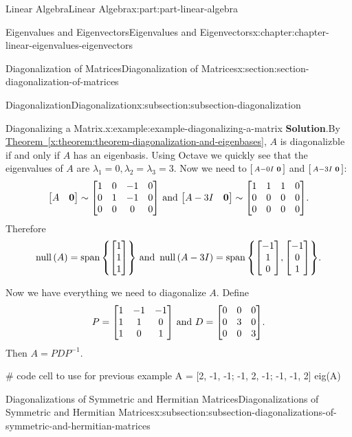 \documentclass[twoside,10pt,]{book}
\newcommand{\blocktitlefont}{\relax}
\newcommand{\xreffont}{\relax}
\numberwithin{equation}{part}
\providecommand{\vb}[1]{\mathbf{#1}}
\newcommand{\nul}[1]{\operatorname{null}{#1}}
\newcommand{\spn}[1]{\operatorname{span}{#1}}
\begin{document}
\begin{partptx}{Linear Algebra}{}{Linear Algebra}{}{}{x:part:part-linear-algebra}
\begin{chapterptx}{Eigenvalues and Eigenvectors}{}{Eigenvalues and Eigenvectors}{}{}{x:chapter:chapter-linear-eigenvalues-eigenvectors}
\begin{sectionptx}{Diagonalization of Matrices}{}{Diagonalization of Matrices}{}{}{x:section:section-diagonalization-of-matrices}
\begin{subsectionptx}{Diagonalization}{}{Diagonalization}{}{}{x:subsection:subsection-diagonalization}
\begin{example}{Diagonalizing a Matrix.}{x:example:example-diagonalizing-a-matrix}
\noindent\textbf{\blocktitlefont Solution}.\hypertarget{g:solution:idm1630558008}{}\quad{}By \hyperref[x:theorem:theorem-diagonalization-and-eigenbases]{Theorem~{\xreffont\ref{x:theorem:theorem-diagonalization-and-eigenbases}}}, \(A\) is diagonalizble if and only if \(A\) has an eigenbasis. Using Octave we quickly see that the eigenvalues of \(A\) are \(\lambda_1 = 0, \lambda_2 = \lambda_3 = 3\). Now we need to \(\smqty[A - 0I & \vb{0}]\) and \(\smqty[A - 3I & \vb{0}]\):%
\begin{equation*}
\mqty[A&\vb{0}] \sim \mqty[1 & 0 & -1 & 0 \\ 0 & 1 & -1 & 0 \\ 0 & 0 & 0 & 0]\text{ and }\mqty[A-3I & \vb{0}] \sim \mqty[1 & 1 & 1 & 0 \\ 0 & 0 & 0 & 0 \\ 0 & 0 & 0 & 0]\text{.}
\end{equation*}
Therefore%
\begin{equation*}
\nul(A) = \spn{\qty{\mqty[1\\1\\1]}}\text{ and }\nul(A-3I) = \spn{\left\{\mqty[-1\\1\\0],\mqty[-1\\0\\1]\right\}}\text{.}
\end{equation*}
%
\par
Now we have everything we need to diagonalize \(A\). Define%
\begin{equation*}
P = \mqty[1 & -1 & -1 \\ 1 & 1 & 0 \\ 1 & 0 & 1]\text{ and }D = \mqty[0 & 0 & 0 \\ 0 & 3 & 0 \\ 0 & 0 & 3]\text{.}
\end{equation*}
Then \(A = PDP^{-1}\).%
\end{example}
\begin{sageinput}
# code cell to use for previous example
A = [2, -1, -1; -1, 2, -1; -1, -1, 2]
eig(A)
\end{sageinput}
\end{subsectionptx}
%
%
\typeout{************************************************}
\typeout{************************************************}
%
\begin{subsectionptx}{Diagonalizations of Symmetric and Hermitian Matrices}{}{Diagonalizations of Symmetric and Hermitian Matrices}{}{}{x:subsection:subsection-diagonalizations-of-symmetric-and-hermitian-matrices}

\end{subsectionptx}
\end{sectionptx}
\end{chapterptx}
\end{partptx}
\end{document}

